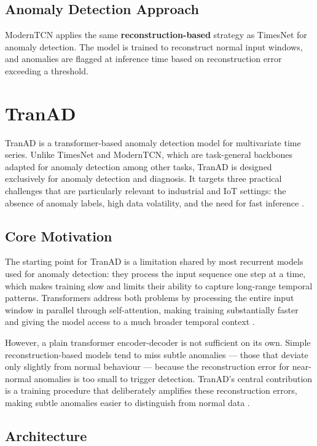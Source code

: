 \documentclass[twoside,11pt,openright]{report}
\begin{document}
\subsection{Anomaly Detection Approach}

ModernTCN applies the same \textbf{reconstruction-based} strategy as TimesNet for
anomaly detection. The model is trained to reconstruct normal input windows, and
anomalies are flagged at inference time based on reconstruction error exceeding a
threshold.


\section{TranAD}

TranAD \citep{tranad2022} is a transformer-based anomaly detection model for
multivariate time series.
Unlike TimesNet and ModernTCN, which are task-general backbones adapted for anomaly
detection among other tasks, TranAD is designed exclusively for anomaly detection
and diagnosis. It targets three practical challenges that are particularly relevant
to industrial and IoT settings: the absence of anomaly labels, high data volatility,
and the need for fast inference \citep{tranad2022}.

\subsection{Core Motivation}

The starting point for TranAD is a limitation shared by most recurrent models used
for anomaly detection: they process the input sequence one step at a time,
which makes training slow and limits their ability to capture long-range temporal
patterns. Transformers address both problems by processing the entire input window
in parallel through self-attention, making training substantially faster and giving
the model access to a much broader temporal context \citep{tranad2022}.

However, a plain transformer encoder-decoder is not sufficient on its own. Simple
reconstruction-based models tend to miss subtle anomalies --- those that deviate only
slightly from normal behaviour --- because the reconstruction error for near-normal
anomalies is too small to trigger detection. TranAD's central contribution is a
training procedure that deliberately amplifies these reconstruction errors, making
subtle anomalies easier to distinguish from normal data \citep{tranad2022}.

\subsection{Architecture}
\end{document}
